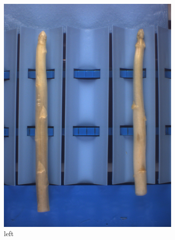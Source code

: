 \begin{figure}[!ht]
	\centering
	\vspace{20pt}
	\begin{subfigure}{0.3\textwidth}
		\includegraphics[width=0.9\linewidth]{Figures/chapter02/querdel_a.png}
		\caption{left}
	\end{subfigure}
	\begin{subfigure}{0.3\textwidth}

\end{subfigure}
\end{figure}

